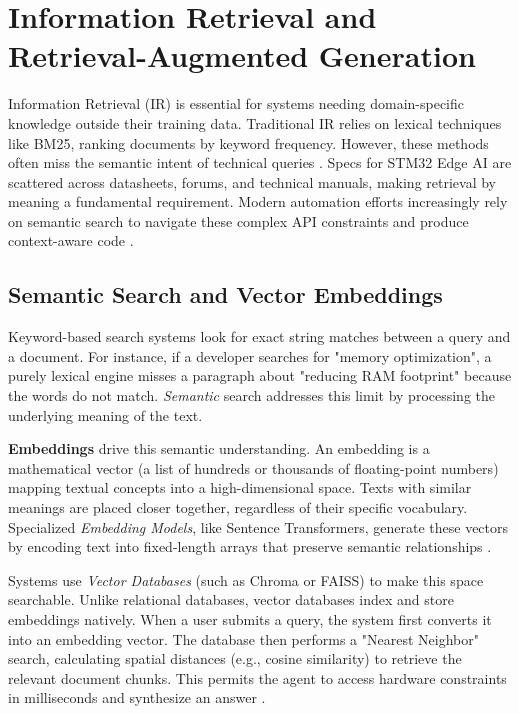\section{Information Retrieval and Retrieval-Augmented Generation}
Information Retrieval (IR) is essential for systems needing domain-specific knowledge outside their training data. Traditional IR relies on lexical techniques like BM25, ranking documents by keyword frequency. However, these methods often miss the semantic intent of technical queries \cite{Manning2008Introduction}. Specs for STM32 Edge AI are scattered across datasheets, forums, and technical manuals, making retrieval by meaning a fundamental requirement. Modern automation efforts increasingly rely on semantic search to navigate these complex API constraints and produce context-aware code \cite{applicationEvaluationCodeGenerated, Gao2024RetrievalAugmentedGN}.

\subsection{Semantic Search and Vector Embeddings}
Keyword-based search systems look for exact string matches between a query and a document. For instance, if a developer searches for "memory optimization", a purely lexical engine misses a paragraph about "reducing RAM footprint" because the words do not match. \textit{Semantic} search addresses this limit by processing the underlying meaning of the text.

\textbf{Embeddings} drive this semantic understanding. An embedding is a mathematical vector (a list of hundreds or thousands of floating-point numbers) mapping textual concepts into a high-dimensional space. Texts with similar meanings are placed closer together, regardless of their specific vocabulary. Specialized \textit{Embedding Models}, like Sentence Transformers, generate these vectors by encoding text into fixed-length arrays that preserve semantic relationships \cite{nie2025textembeddingmeetslarge}.

Systems use \textit{Vector Databases} (such as Chroma or FAISS) to make this space searchable. Unlike relational databases, vector databases index and store embeddings natively. When a user submits a query, the system first converts it into an embedding vector. The database then performs a "Nearest Neighbor" search, calculating spatial distances (e.g., cosine similarity) to retrieve the relevant document chunks. This permits the agent to access hardware constraints in milliseconds and synthesize an answer \cite{ma2025comprehensivesurveyvectordatabase}.

